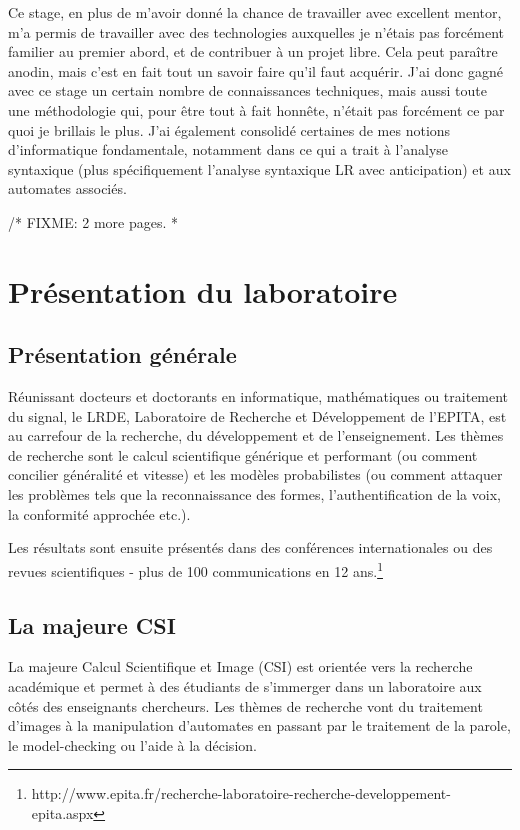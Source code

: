 \documentclass[a4paper,11pt,twoside,final]{article}
\begin{document}
  Ce stage, en plus de m'avoir donné la chance de travailler avec excellent
  mentor, m'a permis de travailler avec des technologies auxquelles je n'étais
  pas forcément familier au premier abord, et de contribuer à un projet libre.
  Cela peut paraître anodin, mais c'est en fait tout un savoir faire qu'il faut
  acquérir. J'ai donc gagné avec ce stage un certain nombre de connaissances
  techniques, mais aussi toute une méthodologie qui, pour être tout à fait
  honnête, n'était pas forcément ce par quoi je brillais le plus. J'ai
  également consolidé certaines de mes notions d'informatique fondamentale,
  notamment dans ce qui a trait à l'analyse syntaxique (plus spécifiquement
  l'analyse syntaxique LR avec anticipation) et aux automates associés.

  /* FIXME: 2 more pages. *

  \cleardoublepage
  \section{Présentation du laboratoire}
  \subsection{Présentation générale}

  Réunissant docteurs et doctorants en informatique, mathématiques ou
  traitement du signal, le LRDE, Laboratoire de Recherche et Développement de
  l'EPITA, est au carrefour de la recherche, du développement et de
  l'enseignement. Les thèmes de recherche sont le calcul scientifique générique
  et performant (ou comment concilier généralité et vitesse) et les modèles
  probabilistes (ou comment attaquer les problèmes tels que la reconnaissance
  des formes, l'authentification de la voix, la conformité approchée etc.).

  Les résultats sont ensuite présentés dans des conférences internationales ou
  des revues scientifiques - plus de 100 communications en 12 ans.\footnote{%
  http://www.epita.fr/recherche-laboratoire-recherche-developpement-epita.aspx}

  \subsection{La majeure CSI}

  La majeure Calcul Scientifique et Image (CSI) est orientée vers la recherche
  académique et permet à des étudiants de s'immerger dans un laboratoire aux
  côtés des enseignants chercheurs. Les thèmes de recherche vont du traitement
  d'images à la manipulation d'automates en passant par le traitement de la
  parole, le model-checking ou l'aide à la décision.
\end{document}
